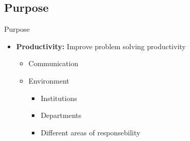 \subsection{Purpose}
\begin{frame}{Purpose}

\begin{itemize}
	\item \textbf{Productivity:} Improve problem solving productivity
	\begin{itemize}
		\item Communication
		\item Environment
		\begin{itemize}
			\item Institutions
			\item Departments
			\item Different areas of responsebility
			\end{itemize}
	\end{itemize}
\end{itemize}


\end{frame}
